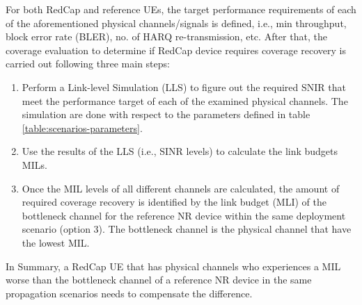 \documentclass[conference]{IEEEtran}
\begin{document}
For both RedCap and reference UEs, the target performance requirements of each of the aforementioned physical channels/signals is defined, i.e., min throughput, block error rate (BLER), no. of HARQ re-transmission, etc. After that, the coverage evaluation to determine if RedCap device requires coverage recovery is carried out following three main steps:
\begin{enumerate}
    \item  Perform a Link-level Simulation (LLS)  to figure out the required SNIR that meet the performance target of each of the examined physical channels. The simulation are done with respect to the parameters defined in table \ref{table:scenarios-parameters}.
    \item Use the results of the LLS (i.e., SINR levels) to calculate the link budgets MILs.
    \item Once the MIL levels of all different channels are calculated, the amount of required coverage recovery is identified by the link budget (MLI) of the bottleneck channel for the reference NR device within the same deployment scenario (option 3). The bottleneck channel is the physical channel that have the lowest MIL.
\end{enumerate}
In Summary, a RedCap UE that has physical channels who experiences a MIL worse than the bottleneck channel of a reference NR device in the same propagation scenarios needs to compensate the difference.  
\end{document}

